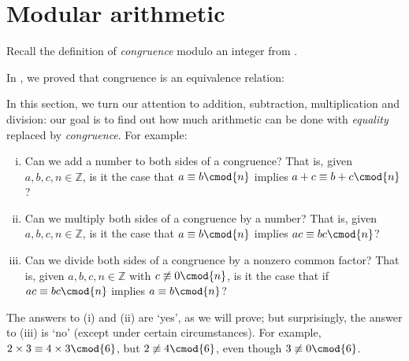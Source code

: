 \section{Modular arithmetic}

Recall the definition of \textit{congruence} modulo an integer from .

\rdefCongruence*

In , we proved that congruence is an equivalence relation:

\rthmCongruenceIsEquivalenceRelation*

In this section, we turn our attention to addition, subtraction, multiplication and division: our goal is to find out how much arithmetic can be done with \textit{equality} replaced by \textit{congruence}. For example:
\begin{enumerate}[(i)]
\item Can we add a number to both sides of a congruence? That is, given $a,b,c,n \in \mathbb{Z}$, is it the case that $a \equiv b \cmod{n}$ implies $a + c \equiv b + c \cmod{n}$?
\item Can we multiply both sides of a congruence by a number? That is, given $a,b,c,n \in \mathbb{Z}$, is it the case that $a \equiv b \cmod{n}$ implies $ac \equiv bc \cmod{n}$?
\item Can we divide both sides of a congruence by a nonzero common factor? That is, given $a,b,c,n \in \mathbb{Z}$ with $c \not\equiv 0 \cmod{n}$, is it the case that if $ac \equiv bc \cmod{n}$ implies $a \equiv b \cmod{n}$?
\end{enumerate}

The answers to (i) and (ii) are `yes', as we will prove; but surprisingly, the answer to (iii) is `no' (except under certain circumstances). For example, $2 \times 3 \equiv 4 \times 3 \cmod{6}$, but $2 \not\equiv 4 \cmod{6}$, even though $3 \not\equiv 0 \cmod{6}$.

